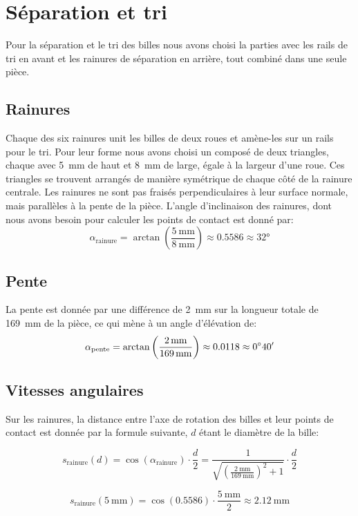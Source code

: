 \section{Séparation et tri}
Pour la séparation et le tri des billes nous avons choisi la parties avec les rails de tri en avant et les rainures de séparation en arrière, tout combiné dans une seule pièce.

\subsection{Rainures}
Chaque des six rainures unit les billes de deux roues et amène-les sur un rails pour le tri. Pour leur forme nous avons choisi un composé de deux triangles, chaque avec \SI{5}{\milli\metre} de haut et \SI{8}{\milli\metre} de large, égale à la largeur d'une roue. Ces triangles se trouvent arrangés de manière symétrique de chaque côté de la rainure centrale. Les rainures ne sont pas fraisés perpendiculaires à leur surface normale, mais parallèles à la pente de la pièce. L'angle d'inclinaison des rainures, dont nous avons besoin pour calculer les points de contact est donné par: \[\alpha_{\text{rainure}} = \arctan\left(\frac{\SI{5}{\milli\metre}}{\SI{8}{\milli\metre}}\right) \approx \num{0.5586} \approx \ang{32}\]

\subsection{Pente}
La pente est donnée par une différence de \SI{2}{\milli\metre} sur la longueur totale de \SI{169}{\milli\metre} de la pièce, ce qui mène à un angle d'élévation de:
\[\alpha_{\text{pente}} = \arctan\left(\frac{\SI{2}{\milli\metre}}{\SI{169}{\milli\metre}}\right) \approx \num{0.0118} \approx \sisetup{add-arc-degree-zero} \ang{;40;}\]

\subsection{Vitesses angulaires}
Sur les rainures, la distance entre l'axe de rotation des billes et leur points de contact est donnée par la formule suivante, $d$ étant le diamètre de la bille:

\[s_{\text{rainure}}(d) = \cos(\alpha_{\text{rainure}}) \cdot \frac{d}{2} = \frac{1}{\sqrt{\left(\frac{\SI{2}{\milli\metre}}{\SI{169}{\milli\metre}}\right)^2+1}} \cdot \frac{d}{2}\]

\[s_{\text{rainure}}(\SI{5}{\milli\metre}) = \cos(0.5586) \cdot \frac{\SI{5}{\milli\metre}}{2} \approx \SI{2.12}{\milli\metre}\]

